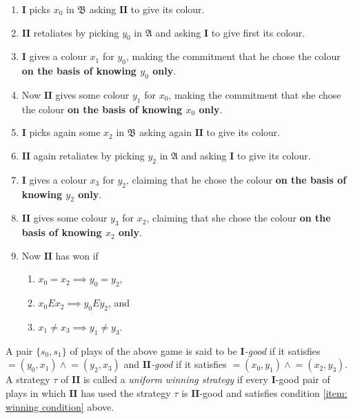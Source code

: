 \documentclass[12pt]{article}
\theoremstyle{definition}
\newcommand{\playerone}{\mathrm{\mathbf{I}}}
\newcommand{\playertwo}{\mathrm{\mathbf{II}}}
\newcommand{\A}{\mathfrak{A}}
\newcommand{\B}{\mathfrak{B}}
\newcommand{\dep}{\mathop{=}}
\def\ma{\A}
\def\mb{\B}
\begin{document}
\begin{enumerate}[label = (\arabic*)]
    \item $\playerone$ picks $x_0$ in $\mb$ asking $\playertwo$ to give its colour.
    \item $\playertwo$ retaliates by picking $y_0$ in $\ma$ and asking $\playerone$ to give first its colour.
    \item $\playerone$ gives a colour $x_1$ for $y_0$, making the commitment that he chose the colour {\bf on the basis of knowing $y_0$ only}.

    \item Now $\playertwo$ gives some colour $y_1$ for $x_0$, making the commitment that she chose the colour {\bf on the basis of knowing $x_0$ only}.

    \item $\playerone$ picks again some $x_2$ in $\mb$ asking again $\playertwo$ to give its colour.
    \item $\playertwo$ again retaliates by picking $y_2$ in $\ma$ and asking $\playerone$ to give its colour.
    \item $\playerone$ gives a colour $x_3$ for $y_2$, claiming that he chose the colour {\bf on the basis of knowing $y_2$ only}.
    \item $\playertwo$ gives some colour $y_3$ for $x_2$, claiming that she chose the colour {\bf on the basis of knowing $x_2$ only}.

    \item\label{item: winning condition}
    Now $\playertwo$ has won if
    \begin{enumerate}
        \item $x_0=x_2\implies y_0=y_2$,
        \item $x_0Ex_2\implies y_0Ey_2$, and
        \item $x_1\ne x_3 \implies y_1\ne y_3$.
    \end{enumerate}
\end{enumerate}

A pair $\{s_0,s_1\}$ of plays of the above game is said to be \emph{$\playerone$-good} if it satisfies $\dep(y_0,x_1)\wedge\dep(y_2,x_3)$ and \emph{$\playertwo$-good} if it satisfies $\dep(x_0,y_1)\wedge\dep(x_2,y_3)$. A strategy $\tau$ of $\playertwo$ is called a \emph{uniform winning strategy} if every $\playerone$-good pair of plays in which $\playertwo$ has used the strategy  $\tau$ is $\playertwo$-good  and satisfies condition \ref{item: winning condition} above. 
\end{document}
